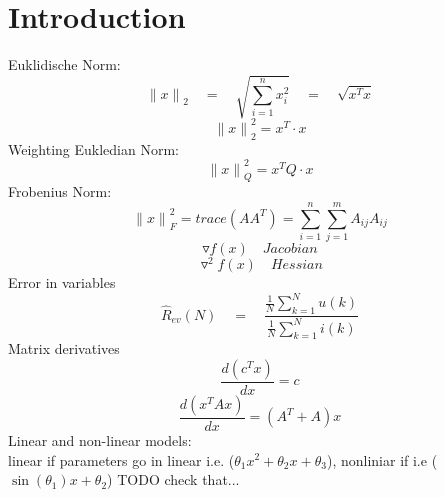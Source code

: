 \section*{Introduction}
Euklidische Norm: 
\begin{equation*}
{ \parallel x\parallel  }_{ 2 }\quad =\quad \sqrt { \sum _{ i=1 }^{ n }{ { x }_{ i }^{ 2 } }  } \quad =\quad \sqrt { { x }^{ T }x }
\end{equation*}
\begin{equation*}
{\parallel x\parallel  }_{ 2 }^{ 2 } = x^T\cdot x
\end{equation*}
Weighting Eukledian Norm:
\begin{equation*}
{\parallel x\parallel  }_{ Q }^{ 2 } = x^TQ \cdot x
\end{equation*}
Frobenius Norm:
\begin{equation*}
{\parallel x\parallel  }_{ F }^{ 2 } = trace(A{ A }^{ T })=\sum _{ i=1 }^{ n } \sum _{ j=1 }^{ m }{ { A }_{ ij }{ A }_{ ij } } 
\end{equation*}
\begin{equation*}
\triangledown f(x) \quad Jacobian
\end{equation*}
\begin{equation*}
{ \triangledown  }^{ 2 }f(x)\quad Hessian
\end{equation*}
Error in variables
\begin{equation*}
\hat { R } _{ ev }(N)\quad =\quad \frac { \frac { 1 }{ N } \sum _{ k=1 }^{ N }{ u(k) }  }{ \frac { 1 }{ N } \sum _{ k=1 }^{ N }{ i(k) }  }
\end{equation*}
Matrix derivatives
\begin{equation*}
\frac{d(c^Tx)}{dx} = c
\end{equation*} 
\begin{equation*}
\frac{d(x^TAx)}{dx} = (A^T + A)x
\end{equation*} 
Linear and non-linear models:\\
linear if parameters go in linear i.e. ($\theta_1 x^2 + \theta_2 x + \theta_3$), nonliniar if i.e ($\sin(\theta_1)x + \theta_2$) TODO check that...

